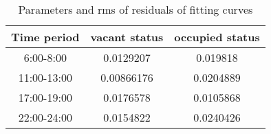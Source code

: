 \begin{table}[!h]
\caption{Parameters and rms of residuals of fitting curves}\label{table_rms}
\centering
\begin{tabular}{c|c|c}
  \hline
  Time period  & vacant status & occupied status \\
  \hline
6:00-8:00   &0.0129207 & 0.019818 \\
11:00-13:00 &0.00866176 & 0.0204889 \\
17:00-19:00 &0.0176578 & 0.0105868 \\
22:00-24:00 &0.0154822 & 0.0240426 \\
  \hline
\end{tabular}
\end{table}

